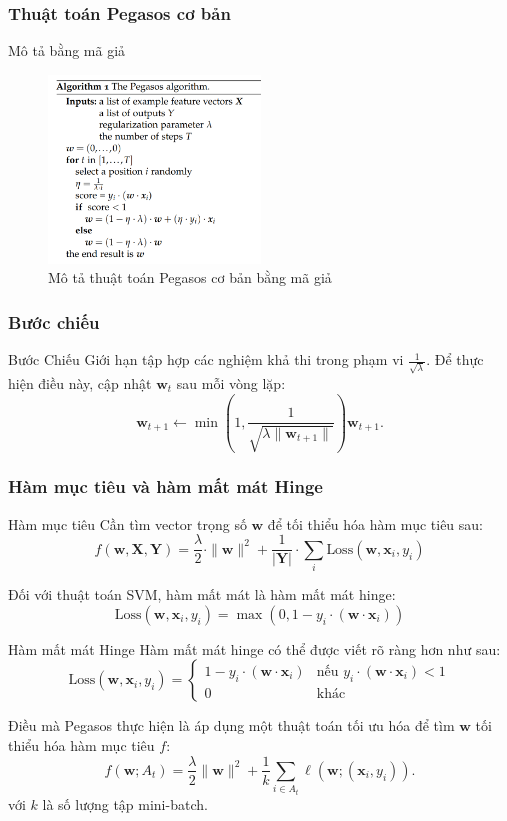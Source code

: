 \documentclass[serif, aspectratio=169]{beamer}
\begin{document}
	\subsubsection{Thuật toán Pegasos cơ bản}
	\begin{frame}{Mô tả bằng mã giả}
		\begin{figure}
			\centering
			\includegraphics[height=5cm]{pic/pegasos-basic.png}
			\caption{Mô tả thuật toán Pegasos cơ bản bằng mã giả}
			\label{fig:svm}
		\end{figure}
	\end{frame}
	\subsubsection{Bước chiếu}
	\begin{frame}{Bước Chiếu}
		Giới hạn tập hợp các nghiệm khả thi trong phạm vi $ \frac{1}{\sqrt{\lambda}} $. Để thực hiện điều này, cập nhật $ \mathbf{w}_t $ sau mỗi vòng lặp:
		$$\mathbf{w}_{t+1} \leftarrow \min\left(1, \frac{1}{\sqrt{\lambda \|\mathbf{w}_{t+1}\|}}\right) \mathbf{w}_{t+1}.$$
	\end{frame}
	\subsubsection{Hàm mục tiêu và hàm mất mát Hinge}
	\begin{frame}{Hàm mục tiêu}
		Cần tìm vector trọng số $ \mathbf{w} $ để tối thiểu hóa hàm mục tiêu sau:
		$$f(\mathbf{w}, \mathbf{X}, \mathbf{Y}) = \frac{\lambda}{2} \cdot \|\mathbf{w}\|^2 + \frac{1}{|\mathbf{Y}|} \cdot \sum_{i} \text{Loss}(\mathbf{w}, \mathbf{x}_i, y_i)$$
		
		Đối với thuật toán SVM, hàm mất mát là hàm mất mát hinge:
		$$\text{Loss}(\mathbf{w}, \mathbf{x}_i, y_i) = \max(0, 1 - y_i \cdot (\mathbf{w} \cdot \mathbf{x}_i))$$
	\end{frame}
	\begin{frame}{Hàm mất mát Hinge}
		Hàm mất mát hinge có thể được viết rõ ràng hơn như sau:
		$$\text{Loss}(\mathbf{w}, \mathbf{x}_i, y_i) =       \begin{cases}           1 - y_i \cdot (\mathbf{w} \cdot \mathbf{x}_i) & \text{nếu } y_i \cdot (\mathbf{w} \cdot \mathbf{x}_i) < 1 \\          0 & \text{khác}      \end{cases}$$
		
		Điều mà Pegasos thực hiện là áp dụng một thuật toán tối ưu hóa để tìm $ \mathbf{w} $ tối thiểu hóa hàm mục tiêu $ f $:
		$$f(\mathbf{w}; A_t) = \frac{\lambda}{2} \|\mathbf{w}\|^2 + \frac{1}{k} \sum_{i \in A_t} \ell(\mathbf{w}; (\mathbf{x}_i, y_i)).$$
		với $ k $ là số lượng tập mini-batch.
	\end{frame}
\end{document}
